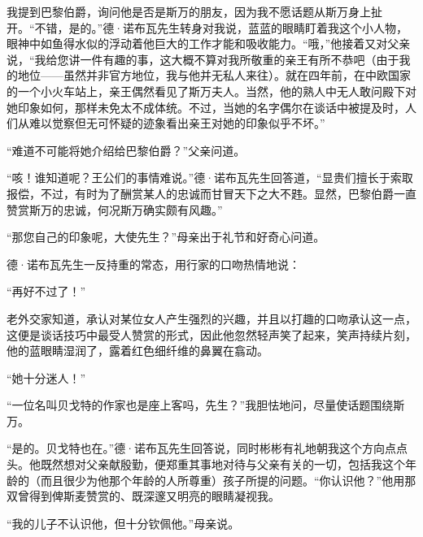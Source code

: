 \par 我提到巴黎伯爵，询问他是否是斯万的朋友，因为我不愿话题从斯万身上扯开。“不错，是的。”德·诺布瓦先生转身对我说，蓝蓝的眼睛盯着我这个小人物，眼神中如鱼得水似的浮动着他巨大的工作才能和吸收能力。“哦，”他接着又对父亲说，“我给您讲一件有趣的事，这大概不算对我所敬重的亲王有所不恭吧（由于我的地位——虽然并非官方地位，我与他并无私人来往）。就在四年前，在中欧国家的一个小火车站上，亲王偶然看见了斯万夫人。当然，他的熟人中无人敢问殿下对她印象如何，那样未免太不成体统。不过，当她的名字偶尔在谈话中被提及时，人们从难以觉察但无可怀疑的迹象看出亲王对她的印象似乎不坏。”
\par “难道不可能将她介绍给巴黎伯爵？”父亲问道。
\par “咳！谁知道呢？王公们的事情难说。”德·诺布瓦先生回答道，“显贵们擅长于索取报偿，不过，有时为了酬赏某人的忠诚而甘冒天下之大不韪。显然，巴黎伯爵一直赞赏斯万的忠诚，何况斯万确实颇有风趣。”
\par “那您自己的印象呢，大使先生？”母亲出于礼节和好奇心问道。
\par 德·诺布瓦先生一反持重的常态，用行家的口吻热情地说：
\par “再好不过了！”
\par 老外交家知道，承认对某位女人产生强烈的兴趣，并且以打趣的口吻承认这一点，这便是谈话技巧中最受人赞赏的形式，因此他忽然轻声笑了起来，笑声持续片刻，他的蓝眼睛湿润了，露着红色细纤维的鼻翼在翕动。
\par “她十分迷人！”
\par “一位名叫贝戈特的作家也是座上客吗，先生？”我胆怯地问，尽量使话题围绕斯万。
\par “是的。贝戈特也在。”德·诺布瓦先生回答说，同时彬彬有礼地朝我这个方向点点头。他既然想对父亲献殷勤，便郑重其事地对待与父亲有关的一切，包括我这个年龄的（而且很少为他那个年龄的人所尊重）孩子所提的问题。“你认识他？”他用那双曾得到俾斯麦赞赏的、既深邃又明亮的眼睛凝视我。
\par “我的儿子不认识他，但十分钦佩他。”母亲说。
